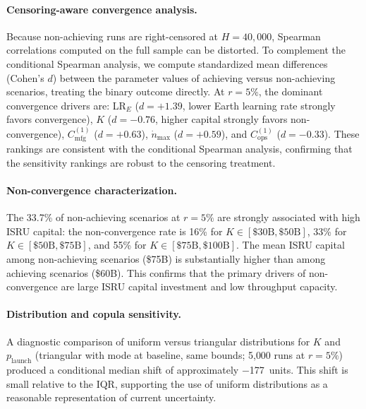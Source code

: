 \documentclass[preprint,12pt]{elsarticle}
\begin{document}
\paragraph{Censoring-aware convergence analysis.} Because non-achieving runs are right-censored at $H = 40{,}000$, Spearman correlations computed on the full sample can be distorted. To complement the conditional Spearman analysis, we compute standardized mean differences (Cohen's $d$) between the parameter values of achieving versus non-achieving scenarios, treating the binary outcome directly. At $r = 5\%$, the dominant convergence drivers are: LR$_E$ ($d = +1.39$, lower Earth learning rate strongly favors convergence), $K$ ($d = -0.76$, higher capital strongly favors non-convergence), $C_{\mathrm{mfg}}^{(1)}$ ($d = +0.63$), $\dot{n}_{\max}$ ($d = +0.59$), and $C_{\mathrm{ops}}^{(1)}$ ($d = -0.33$). These rankings are consistent with the conditional Spearman analysis, confirming that the sensitivity rankings are robust to the censoring treatment.

\paragraph{Non-convergence characterization.} The 33.7\% of non-achieving scenarios at $r = 5\%$ are strongly associated with high ISRU capital: the non-convergence rate is 16\% for $K \in [\$30\text{B}, \$50\text{B}]$, 33\% for $K \in [\$50\text{B}, \$75\text{B}]$, and 55\% for $K \in [\$75\text{B}, \$100\text{B}]$. The mean ISRU capital among non-achieving scenarios (\$75B) is substantially higher than among achieving scenarios (\$60B). This confirms that the primary drivers of non-convergence are large ISRU capital investment and low throughput capacity.

\paragraph{Distribution and copula sensitivity.} A diagnostic comparison of uniform versus triangular distributions for $K$ and $p_{\mathrm{launch}}$ (triangular with mode at baseline, same bounds; 5{,}000 runs at $r = 5\%$) produced a conditional median shift of approximately $-$177~units. This shift is small relative to the IQR, supporting the use of uniform distributions as a reasonable representation of current uncertainty.
\end{document}
